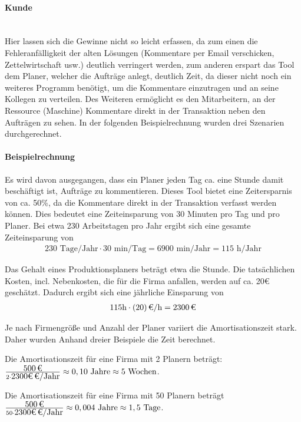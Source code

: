 \paragraph{Kunde}\mbox{} \\
Hier lassen sich die Gewinne nicht so leicht erfassen, da zum einen die Fehleranfälligkeit der alten Lösungen (Kommentare per Email verschicken, Zettelwirtschaft usw.) deutlich verringert werden, zum anderen erspart das Tool dem Planer, welcher die Aufträge anlegt, deutlich Zeit, da dieser nicht noch ein weiteres Programm benötigt, um die Kommentare einzutragen und an seine Kollegen zu verteilen. Des Weiteren ermöglicht es den Mitarbeitern, an der Ressource (Maschine) Kommentare direkt in der Transaktion neben den Aufträgen zu sehen. In der folgenden Beispielrechnung wurden drei Szenarien durchgerechnet. 

\paragraph{Beispielrechnung}
Es wird davon ausgegangen, dass ein Planer jeden Tag ca. eine Stunde damit beschäftigt ist, Aufträge zu kommentieren. Dieses Tool bietet eine Zeitersparnis von ca. 50\%, da die Kommentare direkt in der Transaktion verfasst werden können. Dies bedeutet eine Zeiteinsparung von 30 Minuten pro Tag und pro Planer. Bei etwa 230 Arbeitstagen pro Jahr ergibt sich eine gesamte Zeiteinsparung von  
\begin{eqnarray}
230 \mbox{ Tage/Jahr} \cdot 30 \mbox{ min/Tag} = 6900 \mbox{ min/Jahr} = 115 \mbox{ h/Jahr} 
\end{eqnarray}

Das Gehalt eines Produktionsplaners beträgt etwa  die Stunde. Die tatsächlichen Kosten, incl. Nebenkosten, die für die Firma anfallen, werden auf ca. 20€ geschätzt. Dadurch ergibt sich eine jährliche Einsparung von 
\begin{eqnarray}
115 \mbox{h} \cdot \eur{(20)}{\mbox{/h}} = \eur{2300}
\end{eqnarray}

Je nach Firmengröße und Anzahl der Planer variiert die Amortisationszeit stark. Daher wurden Anhand dreier Beispiele die Zeit berechnet.

Die Amortisationszeit für eine Firma mit 2 Planern beträgt:
$\frac{\eur{500}}{2 \cdot \eur{2300€} \mbox{/Jahr} } \approx 0,10 \mbox{ Jahre} \approx 5 \mbox{ Wochen}$.

Die Amortisationszeit für eine Firma mit 50 Planern beträgt
$\frac{\eur{500}}{50 \cdot \eur{2300€} \mbox{/Jahr} } \approx 0,004 \mbox{ Jahre} \approx 1,5 \mbox{ Tage}$.

